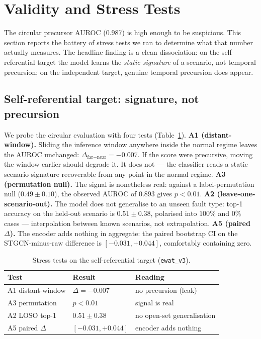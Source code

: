 \section{Validity and Stress Tests}
\label{sec:validity}

The circular precursor AUROC ($0.987$) is high enough to be suspicious. This section reports the
battery of stress tests we ran to determine what that number actually measures. The headline
finding is a clean dissociation: on the self-referential target the model learns the \emph{static
signature} of a scenario, not temporal precursion; on the independent target, genuine temporal
precursion does appear.

\subsection{Self-referential target: signature, not precursion}
We probe the circular evaluation with four tests (Table~\ref{tab:phaseA}).
\textbf{A1 (distant-window).} Sliding the inference window anywhere inside the normal regime leaves
the AUROC unchanged: $\Delta_{\text{far}-\text{near}}=-0.007$. If the score were precursive, moving
the window earlier should degrade it. It does not --- the classifier reads a static scenario
signature recoverable from any point in the normal regime.
\textbf{A3 (permutation null).} The signal is nonetheless real: against a label-permutation null
($0.49\pm0.10$), the observed AUROC of $0.893$ gives $p<0.01$.
\textbf{A2 (leave-one-scenario-out).} The model does not generalise to an unseen fault type: top-1
accuracy on the held-out scenario is $0.51\pm0.38$, polarised into $100\%$ and $0\%$ cases ---
interpolation between known scenarios, not extrapolation.
\textbf{A5 (paired $\Delta$).} The encoder adds nothing in aggregate: the paired bootstrap CI on
the STGCN-minus-raw difference is $[-0.031,+0.044]$, comfortably containing zero.

\begin{table}[t]
\centering
\caption{Stress tests on the self-referential target (\texttt{ewat\_v3}).}
\label{tab:phaseA}
\small
\begin{tabularx}{\columnwidth}{@{}llX@{}}
\toprule
\textbf{Test} & \textbf{Result} & \textbf{Reading} \\
\midrule
A1 distant-window & $\Delta=-0.007$ & no precursion (leak) \\
A3 permutation    & $p<0.01$        & signal is real \\
A2 LOSO top-1     & $0.51\pm0.38$   & no open-set generalisation \\
A5 paired $\Delta$& $[-0.031,+0.044]$ & encoder adds nothing \\
\bottomrule
\end{tabularx}
\end{table}

